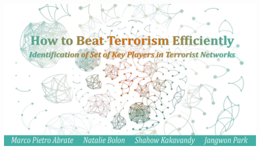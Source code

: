 \documentclass[aspectratio=169]{beamer}
\begin{document}
\begin{frame}
\begin{minipage}{0.48\linewidth}
		\includegraphics[width=\linewidth,trim={0 0 0 5cm},clip]{project_27_slides}
	\end{minipage}
	\hfill
	\begin{minipage}{0.48\linewidth}

\end{minipage}
\end{frame}
\end{document}
